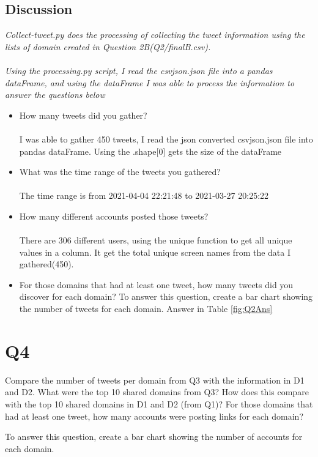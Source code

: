 \documentclass[12pt]{article}
\begin{document}
\subsection*{Discussion}
\emph{Collect-tweet.py does the processing of collecting the tweet information using the lists of domain created in Question 2B(Q2/finalB.csv).\\ \\Using the processing.py script, I read the csvjson.json file into a pandas dataFrame, and using the dataFrame I was able to process the information to answer the questions below}
    \begin{itemize}
        \item How many tweets did you gather?\\ \\ I was able to gather 450 tweets, I read the json converted csvjson.json file into pandas dataFrame. Using the .shape[0] gets the size of the dataFrame
        \item What was the time range of the tweets you gathered?\\ \\ The time range is from 2021-04-04 22:21:48 to 2021-03-27 20:25:22
        \item How many different accounts posted those tweets?\\ \\ There are 306 different users, using the unique function to get all unique values in a column. It get the total unique screen names from the data I gathered(450).
        
        \item For those domains that had at least one tweet, how many tweets did you discover for each domain? To answer this question, create a bar chart showing the number of tweets for each domain.
        Answer in Table \ref{fig:Q2Ans}
    \end{itemize}
\section*{Q4}
Compare the number of tweets per domain from Q3 with the information in D1 and D2. What were the top 10 shared domains from Q3? How does this compare with the top 10 shared domains in D1 and D2 (from Q1)?
For those domains that had at least one tweet, how many accounts were posting links for each domain?

To answer this question, create a bar chart showing the number of accounts for each domain.
\end{document}
